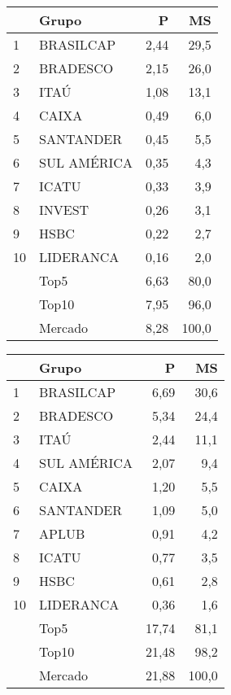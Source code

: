 \documentclass[../../relatorio.tex]{subfiles}
\begin{document}
\begin{table}[!h]
  \begin{minipage}[t]{0.49\linewidth}
    \centering
\begin{tabular}{llrr}
  \hline
 & Grupo & P & MS \\ 
  \hline
1 & BRASILCAP & 2,44 & 29,5 \\ 
  2 & BRADESCO & 2,15 & 26,0 \\ 
  3 & ITAÚ & 1,08 & 13,1 \\ 
  4 & CAIXA & 0,49 & 6,0 \\ 
  5 & SANTANDER & 0,45 & 5,5 \\ 
  6 & SUL AMÉRICA & 0,35 & 4,3 \\ 
  7 & ICATU & 0,33 & 3,9 \\ 
  8 & INVEST & 0,26 & 3,1 \\ 
  9 & HSBC & 0,22 & 2,7 \\ 
  10 & LIDERANCA & 0,16 & 2,0 \\ 
   \hline
 & Top5 & 6,63 & 80,0 \\ 
   & Top10 & 7,95 & 96,0 \\ 
   & Mercado & 8,28 & 100,0 \\ 
   \hline
\end{tabular}    
  \end{minipage}
  \hspace{0.5cm}
  \begin{minipage}[t]{0.49\linewidth}
    \centering
\begin{tabular}{llrr}
  \hline
 & Grupo & P & MS \\ 
  \hline
1 & BRASILCAP & 6,69 & 30,6 \\ 
  2 & BRADESCO & 5,34 & 24,4 \\ 
  3 & ITAÚ & 2,44 & 11,1 \\ 
  4 & SUL AMÉRICA & 2,07 & 9,4 \\ 
  5 & CAIXA & 1,20 & 5,5 \\ 
  6 & SANTANDER & 1,09 & 5,0 \\ 
  7 & APLUB & 0,91 & 4,2 \\ 
  8 & ICATU & 0,77 & 3,5 \\ 
  9 & HSBC & 0,61 & 2,8 \\ 
  10 & LIDERANCA & 0,36 & 1,6 \\ 
   \hline
 & Top5 & 17,74 & 81,1 \\ 
   & Top10 & 21,48 & 98,2 \\ 
   & Mercado & 21,88 & 100,0 \\ 
   \hline
\end{tabular}    
  \end{minipage}
\end{table}

\pagebreak
\end{document}
